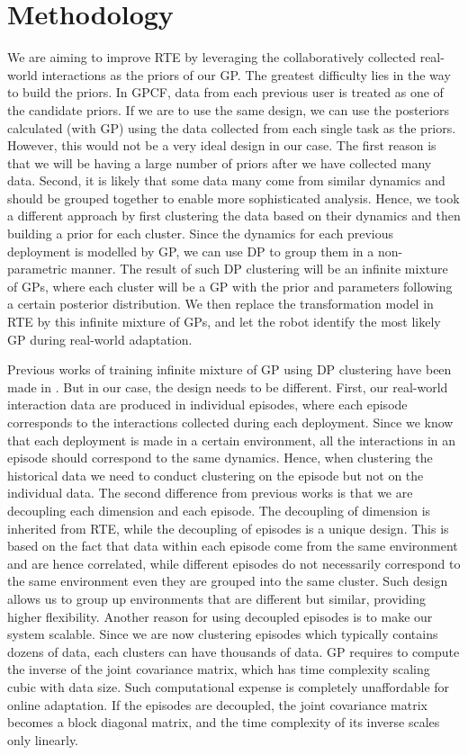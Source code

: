 
\section{Methodology}
We are aiming to improve RTE by leveraging the collaboratively collected real-world interactions as the priors of our GP.
The greatest difficulty lies in the way to build the priors.
In GPCF, data from each previous user is treated as one of the candidate priors.
If we are to use the same design, we can use the posteriors calculated (with GP) using the data collected from each single task as the priors.
However, this would not be a very ideal design in our case.
The first reason is that we will be having a large number of priors after we have collected many data.
Second, it is likely that some data many come from similar dynamics and should be grouped together to enable more sophisticated analysis.
Hence, we took a different approach by first clustering the data based on their dynamics and then building a prior for each cluster.
Since the dynamics for each previous deployment is modelled by GP, we can use DP to group them in a non-parametric manner.
The result of such DP clustering will be an infinite mixture of GPs, where each cluster will be a GP with the prior and parameters following a certain posterior distribution.
We then replace the transformation model in RTE by this infinite mixture of GPs, and let the robot identify the most likely GP during real-world adaptation.



Previous works of training infinite mixture of GP using DP clustering have been made in \cite{infinite_MGP, variational_MGP}. 
But in our case, the design needs to be different.
First, our real-world interaction data are produced in individual episodes, where each episode corresponds to the interactions collected during each deployment.
Since we know that each deployment is made in a certain environment, all the interactions in an episode should correspond to the same dynamics. 
Hence, when clustering the historical data we need to conduct clustering on the episode but not on the individual data. 
The second difference from previous works is that we are decoupling each dimension and each episode.
The decoupling of dimension is inherited from RTE, while the decoupling of episodes is a unique design.
This is based on the fact that data within each episode come from the same environment and are hence correlated, while different episodes do not necessarily correspond to the same environment even they are grouped into the same cluster.
Such design allows us to group up environments that are different but similar, providing higher flexibility.
Another reason for using decoupled episodes is to make our system scalable.
Since we are now clustering episodes which typically contains dozens of data, each clusters can have thousands of data.
GP requires to compute the inverse of the joint covariance matrix, which has time complexity scaling cubic with data size.
Such computational expense is completely unaffordable for online adaptation. 
If the episodes are decoupled, the joint covariance matrix becomes a block diagonal matrix, and the time complexity of its inverse scales only linearly.



